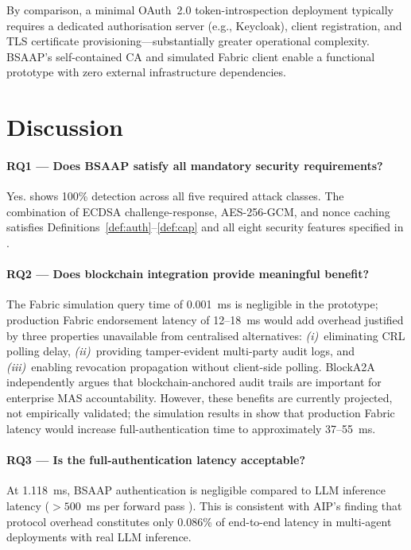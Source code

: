 \documentclass[review,5p,twocolumn,times]{elsarticle}
\begin{document}
By comparison, a minimal OAuth~2.0 token-introspection deployment
typically requires a dedicated authorisation server (e.g., Keycloak),
client registration, and TLS certificate provisioning---substantially
greater operational complexity. BSAAP's self-contained CA and simulated
Fabric client enable a functional prototype with zero external
infrastructure dependencies.

\section{Discussion}\label{sec:discussion}

\paragraph{RQ1 --- Does BSAAP satisfy all mandatory security requirements?}
Yes.  shows 100\% detection across all five required attack
classes. The combination of ECDSA challenge-response, AES-256-GCM, and nonce
caching satisfies Definitions~\ref{def:auth}--\ref{def:cap} and all eight
security features specified in .

\paragraph{RQ2 --- Does blockchain integration provide meaningful benefit?}
The Fabric simulation query time of 0.001~ms is negligible in the prototype;
production Fabric endorsement latency of 12--18~ms
\cite{androulaki2018hyperledger} would add overhead justified by three
properties unavailable from centralised alternatives:
\emph{(i)}~eliminating CRL polling delay,
\emph{(ii)}~providing tamper-evident multi-party audit logs, and
\emph{(iii)}~enabling revocation propagation without client-side polling.
BlockA2A \cite{blocka2a2025} independently argues that blockchain-anchored
audit trails are important for enterprise MAS accountability.
However, these benefits are currently projected, not empirically validated;
the simulation results in  show that production Fabric
latency would increase full-authentication time to approximately 37--55~ms.

\paragraph{RQ3 --- Is the full-authentication latency acceptable?}
At 1.118~ms, BSAAP authentication is negligible compared to LLM inference
latency ($>500$~ms per forward pass \cite{aip2026}). This is consistent
with AIP's finding that protocol overhead constitutes only 0.086\% of
end-to-end latency in multi-agent deployments with real LLM inference.
\end{document}
